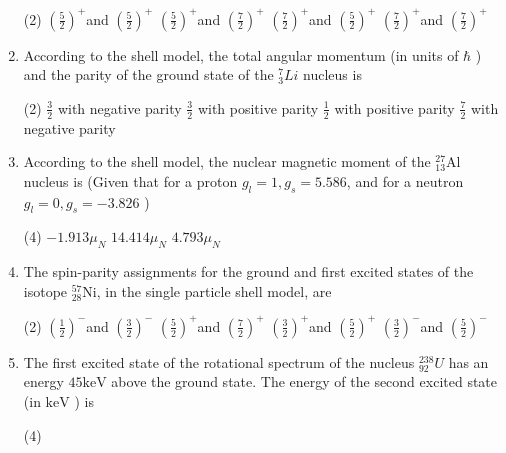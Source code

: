 \begin{enumerate}
	{}
 \begin{tasks}(2)
	\task[\textbf{a.}]$\left(\frac{5}{2}\right)^{+}$and $\left(\frac{5}{2}\right)^{+}$
	\task[\textbf{b.}]$\left(\frac{5}{2}\right)^{+}$and $\left(\frac{7}{2}\right)^{+}$
	\task[\textbf{c.}]$\left(\frac{7}{2}\right)^{+}$and $\left(\frac{5}{2}\right)^{+}$
	\task[\textbf{d.}] $\left(\frac{7}{2}\right)^{+}$and $\left(\frac{7}{2}\right)^{+}$
\end{tasks}
	\item  According to the shell model, the total angular momentum (in units of $\hbar$ ) and the parity of the ground state of the ${ }_3^7 L i$ nucleus is
	{}
 \begin{tasks}(2)
	\task[\textbf{a.}]$\frac{3}{2}$ with negative parity
	\task[\textbf{b.}]$\frac{3}{2}$ with positive parity
	\task[\textbf{c.}]$\frac{1}{2}$ with positive parity
	\task[\textbf{d.}] $\frac{7}{2}$ with negative parity
\end{tasks}
	\item  According to the shell model, the nuclear magnetic moment of the ${ }_{13}^{27} \mathrm{Al}$ nucleus is (Given that for a proton $g_l=1, g_s=5.586$, and for a neutron $g_l=0, g_s=-3.826$ )
	{}
 \begin{tasks}(4)
	\task[\textbf{a.}] $-1.913 \mu_N$
	\task[\textbf{b.}] $14.414 \mu_N$
	\task[\textbf{c.}]$4.793 \mu_N$
\end{tasks}
	\item  The spin-parity assignments for the ground and first excited states of the isotope ${ }_{28}^{57} \mathrm{Ni}$, in the single particle shell model, are
	{}
 \begin{tasks}(2)
	\task[\textbf{a.}]$\left(\frac{1}{2}\right)^{-}$and $\left(\frac{3}{2}\right)^{-}$
	\task[\textbf{b.}] $\left(\frac{5}{2}\right)^{+}$and $\left(\frac{7}{2}\right)^{+}$
	\task[\textbf{c.}]$\left(\frac{3}{2}\right)^{+}$and $\left(\frac{5}{2}\right)^{+}$
	\task[\textbf{d.}] $\left(\frac{3}{2}\right)^{-}$and $\left(\frac{5}{2}\right)^{-}$
\end{tasks}
	\item  The first excited state of the rotational spectrum of the nucleus ${ }_{92}^{238} U$ has an energy $45 \mathrm{keV}$ above the ground state. The energy of the second excited state (in $\mathrm{keV}$ ) is
	{}
 \begin{tasks}(4)

\end{tasks}
\end{enumerate}
